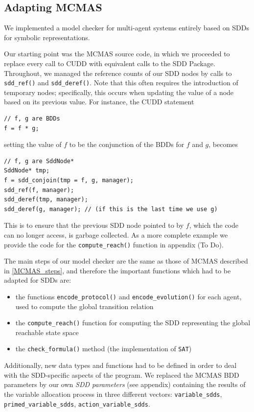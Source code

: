 \documentclass[11pt]{report}
\begin{document}
\subsection{Adapting MCMAS}

We implemented a model checker for multi-agent systems entirely based on SDDs for symbolic representations. 

Our starting point was the MCMAS source code, in which we proceeded to replace every call to CUDD with equivalent calls to the SDD Package. Throughout, we managed the reference counts of our SDD nodes by calls to \texttt{sdd\_ref()} and 
\texttt{sdd\_deref()}. Note that this often requires the introduction of temporary nodes; specifically, this occurs when updating the value of a node based on its previous value. For instance, the CUDD statement 
\begin{verbatim}
// f, g are BDDs
f = f * g; 
\end{verbatim}
setting the value of $f$ to be the conjunction of the BDDs for $f$ and $g$, becomes
\begin{verbatim}
// f, g are SddNode*
SddNode* tmp;
f = sdd_conjoin(tmp = f, g, manager);
sdd_ref(f, manager);
sdd_deref(tmp, manager);
sdd_deref(g, manager); // (if this is the last time we use g)
\end{verbatim}
This is to ensure that the previous SDD node pointed to by $f$, which the code can no longer access, is garbage collected. As a more complete example we provide the code for the \texttt{compute\_reach()} function in appendix (To Do).

The main steps of our model checker are the same as those of MCMAS described in \ref{MCMAS_steps}, and therefore the important functions which had to be adapted for SDDs are: 
\begin{itemize}
\item the functions \texttt{encode\_protocol()}  and \texttt{encode\_evolution()} for each agent, used to compute the global transition relation
\item the \texttt{compute\_reach()} function for computing the SDD representing the global reachable state space
\item the \texttt{check\_formula()} method (the implementation of \texttt{SAT})
\end{itemize}

Additionally, new data types and functions had to be defined in order to deal with the SDD-specific aspects of the program. We replaced the MCMAS BDD parameters by our own \textit{SDD parameters} (see appendix) containing the results of the variable allocation process in three different vectors: \texttt{variable\_sdds}, \texttt{primed\_variable\_sdds}, \texttt{action\_variable\_sdds}.
\end{document}
